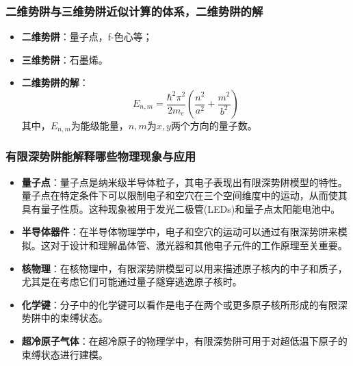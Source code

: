 \subsubsection{二维势阱与三维势阱近似计算的体系，二维势阱的解}

\begin{itemize}
    \item \textbf{二维势阱}：量子点，f-色心等；
    \item \textbf{三维势阱}：石墨烯。
    \item \textbf{二维势阱的解}：
    \begin{equation*}
        E_{n, m}=\frac{\hbar^2 \pi^2}{2 m_e}\left(\frac{n^2}{a^2}+\frac{m^2}{b^2}\right)
    \end{equation*}
    其中，$E_{n, m}$为能级能量，$n, m$为$x, y$两个方向的量子数。
\end{itemize}

\subsubsection{有限深势阱能解释哪些物理现象与应用}

\begin{itemize}
    \item \textbf{量子点}：量子点是纳米级半导体粒子，其电子表现出有限深势阱模型的特性。量子点在特定条件下可以限制电子和空穴在三个空间维度中的运动，从而使其具有量子性质。这种现象被用于发光二极管(LEDs)和量子点太阳能电池中。
    \item \textbf{半导体器件}：在半导体物理学中，电子和空穴的运动可以通过有限深势阱来模拟。这对于设计和理解晶体管、激光器和其他电子元件的工作原理至关重要。
    \item \textbf{核物理}：在核物理中，有限深势阱模型可以用来描述原子核内的中子和质子，尤其是在考虑它们可能通过量子隧穿逃逸原子核时。
    \item \textbf{化学键}：分子中的化学键可以看作是电子在两个或更多原子核所形成的有限深势阱中的束缚状态。
    \item \textbf{超冷原子气体}：在超冷原子的物理学中，有限深势阱可用于对超低温下原子的束缚状态进行建模。
\end{itemize}